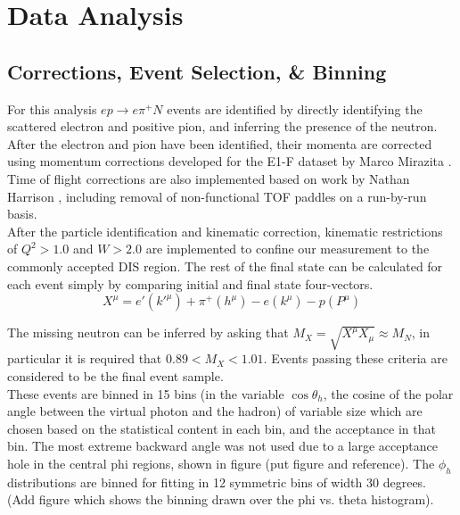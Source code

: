 \section{Data Analysis}


\subsection{Corrections, Event Selection, \& Binning}
For this analysis $ep \rightarrow e\pi^+N$ events are identified by directly identifying the scattered electron and positive pion, and inferring the presence of the neutron.  
\\
After the electron and pion have been identified, their momenta are corrected using momentum corrections developed for the E1-F dataset by Marco Mirazita \cite{mirazita}.  Time of flight corrections are also implemented based on work by Nathan Harrison \cite{harrison}, including removal of non-functional TOF paddles on a run-by-run basis.
\\
After the particle identification and kinematic correction, kinematic restrictions of $Q^{2} > 1.0$ and $W > 2.0$ are implemented to confine our measurement to the commonly accepted DIS region.  The rest of the final state can be calculated for each event simply by comparing initial and final state four-vectors.
\begin{equation}
	X^{\mu} = e'(k'^{\mu}) + \pi^{+}(h^{\mu}) - e(k^\mu) - p(P^\mu) 
\end{equation}  

The missing neutron can be inferred by asking that $M_X = \sqrt{X^{\mu}X_{\mu}} \approx M_{N}$, in particular it is required that $0.89 < M_{X} < 1.01$.  Events passing these criteria are considered to be the final event sample.     
\\
These events are binned in 15 bins (in the variable $\cos{\theta_h}$, the cosine of the polar angle between the virtual photon and the hadron) of variable size which are chosen based on the statistical content in each bin, and the acceptance in that bin.  The most extreme backward angle was not used due to a large acceptance hole in the central phi regions, shown in figure (put figure and reference).  The $\phi_h$ distributions are binned for fitting in 12 symmetric bins of width 30 degrees.  (Add figure which shows the binning drawn over the phi vs. theta histogram).      


